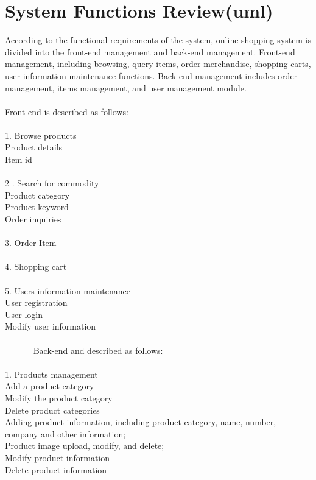 \section{System Functions Review(uml)}
According to the functional requirements of the system, online shopping system is divided into the front-end management and back-end management. Front-end management, including browsing, query items, order merchandise, shopping carts, user information maintenance functions. Back-end management includes order management, items management, and user management module.\\
\\
Front-end is described as follows:\\
\\
1. Browse products\\
   Product details\\
   Item id\\
\\
 2 . Search for commodity\\
   Product category\\
   Product keyword\\
   Order inquiries\\
   \\
3. Order Item\\
\\
4. Shopping cart\\
\\
5. Users information maintenance\\
   User registration\\
   User login\\
   Modify user information\\
   \\
   ~      ~         ~               ~
Back-end and described as follows:\\
\\
1. Products management\\
  Add a product category\\
  Modify the product category\\
  Delete product categories\\
  Adding product information, including product category, name, number, company and other information;\\
  Product image upload, modify, and delete;\\
  Modify product information\\
  Delete product information\\
